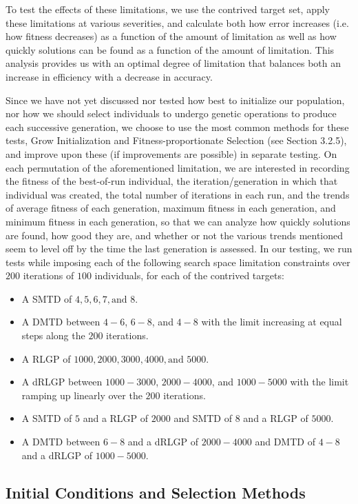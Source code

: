 \documentclass[a4paper,12pt]{report} 	%
\numberwithin{figure}{chapter}
\numberwithin{table}{chapter}
\numberwithin{equation}{chapter}
\begin{document}
\begin{flushleft}
To test the effects of these limitations, we use the contrived target set, apply these limitations at various severities, and calculate both how error increases (i.e. how fitness decreases) as a function of the amount of limitation as well as how quickly solutions can be found as a function of the amount of limitation. This analysis provides us with an optimal degree of limitation that balances both an increase in efficiency with a decrease in accuracy.

Since we have not yet discussed nor tested how best to initialize our population, nor how we should select individuals to undergo genetic operations to produce each successive generation, we choose to use the most common methods for these tests, Grow Initialization and Fitness-proportionate Selection (see Section 3.2.5), and improve upon these (if improvements are possible) in separate testing. On each permutation of the aforementioned limitation, we are interested in recording the fitness of the best-of-run individual, the iteration/generation in which that individual was created, the total number of iterations in each run, and the trends of average fitness of each generation, maximum fitness in each generation, and minimum fitness in each generation, so that we can analyze how quickly solutions are found, how good they are, and whether or not the various trends mentioned seem to level off by the time the last generation is assessed. In our testing, we run tests while imposing each of the following search space limitation constraints over $200$ iterations of $100$ individuals, for each of the contrived targets:
\begin{itemize}
\item A SMTD of $4,5,6,7, \text{and }8$.
\item A DMTD between $4-6$, $6-8$, and $4-8$ with the limit increasing at equal steps along the $200$ iterations.
\item A RLGP of $1000, 2000, 3000, 4000, \text{and } 5000$.
\item A dRLGP between $1000-3000$, $2000-4000$, and $1000-5000$ with the limit ramping up linearly over the $200$ iterations.
\item A SMTD of $5$ and a RLGP of $2000$ and SMTD of $8$ and a RLGP of $5000$.
\item A DMTD between $6-8$ and a dRLGP of $2000-4000$ and DMTD of $4-8$ and a dRLGP of $1000-5000$.
\end{itemize}

\subsection{Initial Conditions and Selection Methods}


\end{flushleft}
\end{document}
